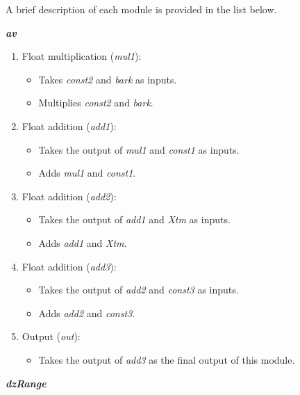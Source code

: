 A brief description of each module is provided in the list below.

\vspace{0.5cm}

\textit{\textbf{av}}

\begin{enumerate}

\item Float multiplication (\textit{mul1}):
\begin{itemize}
\item Takes \textit{const2} and \textit{bark} as inputs.
\item Multiplies \textit{const2} and \textit{bark}.
\end{itemize}

\item Float addition (\textit{add1}):
\begin{itemize}
\item Takes the output of \textit{mul1} and \textit{const1} as inputs.
\item Adds \textit{mul1} and \textit{const1}.
\end{itemize}

\item Float addition (\textit{add2}):
\begin{itemize}
\item Takes the output of \textit{add1} and \textit{Xtm} as inputs.
\item Adds \textit{add1} and \textit{Xtm}.
\end{itemize}

\item Float addition (\textit{add3}):
\begin{itemize}
\item Takes the output of \textit{add2} and \textit{const3} as inputs.
\item Adds \textit{add2} and \textit{const3}.
\end{itemize}

\item Output (\textit{out}):
\begin{itemize}
\item Takes the output of \textit{add3} as the final output of this module.
\end{itemize}

\end{enumerate}

\vspace{0.5cm}

\textit{\textbf{dzRange}}

